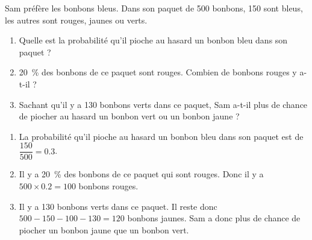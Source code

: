 \begin{exercice*}
    Sam préfère les bonbons bleus. Dans son paquet de 500 bonbons, 150 sont bleus, les autres sont rouges, jaunes ou verts.

    \begin{enumerate}
        \item Quelle est la probabilité qu'il pioche au hasard un bonbon bleu dans son paquet ?
        \item \SI{20}{\percent} des bonbons de ce paquet sont rouges. Combien de bonbons rouges y a-t-il ?
        \item Sachant qu'il y a 130 bonbons verts dans ce paquet, Sam a-t-il plus de chance de piocher au hasard un bonbon vert ou un bonbon jaune ?
    \end{enumerate}
\end{exercice*}
\begin{corrige}
    \begin{enumerate}
        \item La probabilité qu'il pioche au hasard un bonbon bleu dans son paquet est de $\dfrac{150}{500} = \num{0,3}$.
        \item Il y a \SI{20}{\percent} des bonbons de ce paquet qui sont rouges. Donc il y a $500 \times \num{0,2} = 100$ bonbons rouges.
        \item Il y a 130 bonbons verts dans ce paquet. Il reste donc $500 - 150 - 100 - 130 = 120$ bonbons jaunes. Sam a donc plus de chance de piocher un bonbon jaune que un bonbon vert.
    \end{enumerate}
\end{corrige}

